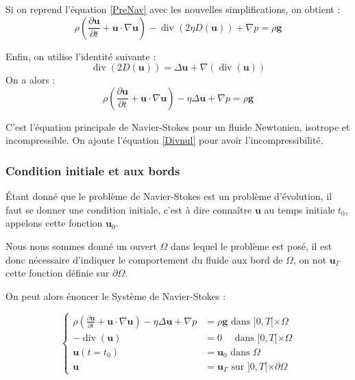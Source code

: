 Si on reprend l'équation \ref{PreNav} avec les nouvelles simplifications, on obtient : 
\begin{equation}
\rho\left(\frac{\partial \mathbf{u}}{\partial t}+\mathbf{u} \cdot \nabla \mathbf{u}\right)-\operatorname{div}(2 \eta D(\mathbf{u}))+\nabla p=\rho \mathbf{g}
\end{equation}

Enfin, on utilise l'identité suivante : 
\[\operatorname{div}(2D(\mathbf{u})) = \Delta \mathbf{u} + \nabla(\operatorname{div}(\mathbf{u}))\]
On a alors : 
\begin{equation}\label{NavPrincipal}
\rho\left(\frac{\partial \mathbf{u}}{\partial t}+\mathbf{u} \cdot \nabla \mathbf{u}\right)-\eta \Delta \mathbf{u} +\nabla p=\rho \mathbf{g}
\end{equation}

C'est l'équation principale de Navier-Stokes pour un fluide Newtonien, isotrope et incompressible.
On ajoute l'équation \ref{Divnul} pour avoir l’incompressibilité.
\subsubsection{Condition initiale et aux bords}

Étant donné que le problème de Navier-Stokes est un problème d'évolution, il faut se donner une condition initiale, c'est à dire connaître $\mathbf{u}$ au temps initiale $t_0$, appelons cette fonction $\mathbf{u}_0$.

Nous nous sommes donné un ouvert $\Omega$ dans lequel le problème est posé, il est donc nécessaire d'indiquer le comportement du fluide aux bord de $\Omega$, on not $\mathbf{u}_{\Gamma}$ cette fonction définie sur $\partial \Omega$.

On peut alors énoncer le Système de Navier-Stokes : 

\begin{equation}\label{SystNavStokes}
\left\{\begin{aligned}
\rho\left(\frac{\partial \mathbf{u}}{\partial t}+\mathbf{u} \cdot \nabla \mathbf{u}\right)-\eta \Delta \mathbf{u}+\nabla p &=\rho \mathbf{g} \text { dans }] 0, T[\times \Omega\\
-\operatorname{div}(\mathbf{u})&=0 \quad \text { dans }] 0, T[\times \Omega\\
\mathbf{u}(t=t_0) &=\mathbf{u}_{0} \text { dans } \Omega \\
\mathbf{u} &=\mathbf{u}_{\Gamma} \text { sur }] 0, T[\times \partial \Omega
\end{aligned}\right.
\end{equation}

